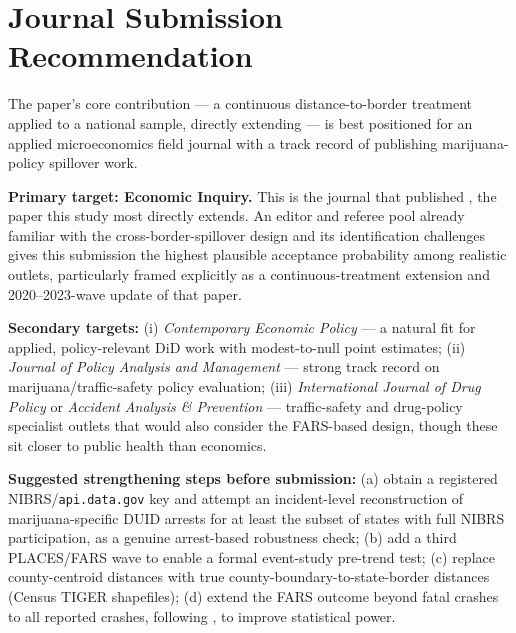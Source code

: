 \documentclass[11pt]{article}
\begin{document}
\section{Journal Submission Recommendation}

The paper's core contribution --- a continuous distance-to-border
treatment applied to a national sample, directly extending
\citet{HaoCowan2020} --- is best positioned for an applied
microeconomics field journal with a track record of publishing
marijuana-policy spillover work.

\textbf{Primary target: Economic Inquiry.} This is the journal that
published \citet{HaoCowan2020}, the paper this study most directly
extends. An editor and referee pool already familiar with the
cross-border-spillover design and its identification challenges gives
this submission the highest plausible acceptance probability among
realistic outlets, particularly framed explicitly as a
continuous-treatment extension and 2020--2023-wave update of that
paper.

\textbf{Secondary targets:} (i) \emph{Contemporary Economic Policy}
--- a natural fit for applied, policy-relevant DiD work with
modest-to-null point estimates; (ii) \emph{Journal of Policy Analysis
and Management} --- strong track record on marijuana/traffic-safety
policy evaluation; (iii) \emph{International Journal of Drug Policy}
or \emph{Accident Analysis \& Prevention} --- traffic-safety and
drug-policy specialist outlets that would also consider the
FARS-based design, though these sit closer to public health than
economics.

\textbf{Suggested strengthening steps before submission:} (a) obtain
a registered NIBRS/\texttt{api.data.gov} key and attempt an
incident-level reconstruction of marijuana-specific DUID arrests for
at least the subset of states with full NIBRS participation, as a
genuine arrest-based robustness check; (b) add a third PLACES/FARS
wave to enable a formal event-study pre-trend test; (c) replace
county-centroid distances with true county-boundary-to-state-border
distances (Census TIGER shapefiles); (d) extend the FARS outcome
beyond fatal crashes to all reported crashes, following
\citet{Moyer2026}, to improve statistical power.



\end{document}
